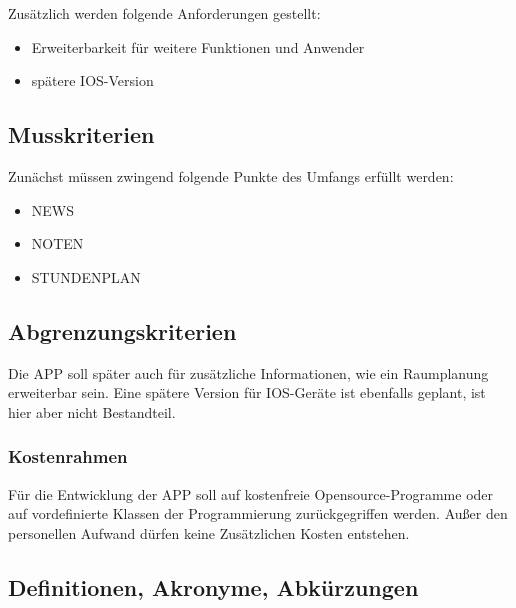 Zusätzlich werden folgende Anforderungen gestellt:

\begin{itemize}
	\item Erweiterbarkeit für weitere Funktionen und Anwender
	\item spätere IOS-Version
\end{itemize}


\subsection{\textbf{Musskriterien}}

Zunächst müssen zwingend folgende Punkte des Umfangs erfüllt werden:

\begin{itemize}
   	\item NEWS
   	\item NOTEN
   	\item STUNDENPLAN   
\end{itemize}

\subsection{\textbf{Abgrenzungskriterien}}

Die \acs{APP} soll später auch für zusätzliche Informationen, wie ein Raumplanung erweiterbar sein. Eine spätere Version für IOS-Geräte ist ebenfalls geplant, ist hier aber nicht Bestandteil.				

\subsubsection{Kostenrahmen}

Für die Entwicklung der \acs{APP} soll auf kostenfreie Opensource-Programme oder auf vordefinierte Klassen der Programmierung zurückgegriffen werden.
Außer den personellen Aufwand dürfen keine Zusätzlichen Kosten entstehen.


\subsection{\textbf{Definitionen, Akronyme, Abkürzungen}}
\begin{acronym}[UV-Licht]

\end{acronym}

